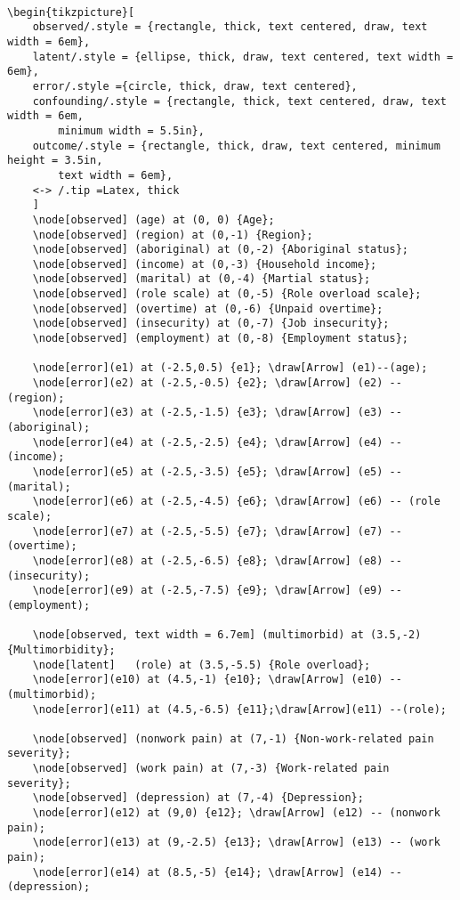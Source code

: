 \documentclass[a4paper]{report}
\begin{document}
\begin{framed}

\begin{Verbatim}

\begin{tikzpicture}[
    observed/.style = {rectangle, thick, text centered, draw, text width = 6em}, 
    latent/.style = {ellipse, thick, draw, text centered, text width = 6em},
    error/.style ={circle, thick, draw, text centered},
    confounding/.style = {rectangle, thick, text centered, draw, text width = 6em, 
        minimum width = 5.5in},
    outcome/.style = {rectangle, thick, draw, text centered, minimum height = 3.5in,
        text width = 6em},
    <-> /.tip =Latex, thick
    ]
    \node[observed] (age) at (0, 0) {Age};
    \node[observed] (region) at (0,-1) {Region};
    \node[observed] (aboriginal) at (0,-2) {Aboriginal status};
    \node[observed] (income) at (0,-3) {Household income};
    \node[observed] (marital) at (0,-4) {Martial status};
    \node[observed] (role scale) at (0,-5) {Role overload scale};
    \node[observed] (overtime) at (0,-6) {Unpaid overtime};
    \node[observed] (insecurity) at (0,-7) {Job insecurity};
    \node[observed] (employment) at (0,-8) {Employment status};

    \node[error](e1) at (-2.5,0.5) {e1}; \draw[Arrow] (e1)--(age);
    \node[error](e2) at (-2.5,-0.5) {e2}; \draw[Arrow] (e2) -- (region);
    \node[error](e3) at (-2.5,-1.5) {e3}; \draw[Arrow] (e3) -- (aboriginal);
    \node[error](e4) at (-2.5,-2.5) {e4}; \draw[Arrow] (e4) -- (income);
    \node[error](e5) at (-2.5,-3.5) {e5}; \draw[Arrow] (e5) -- (marital);
    \node[error](e6) at (-2.5,-4.5) {e6}; \draw[Arrow] (e6) -- (role scale);
    \node[error](e7) at (-2.5,-5.5) {e7}; \draw[Arrow] (e7) -- (overtime);
    \node[error](e8) at (-2.5,-6.5) {e8}; \draw[Arrow] (e8) -- (insecurity);
    \node[error](e9) at (-2.5,-7.5) {e9}; \draw[Arrow] (e9) -- (employment);
    
    \node[observed, text width = 6.7em] (multimorbid) at (3.5,-2) {Multimorbidity};
    \node[latent]   (role) at (3.5,-5.5) {Role overload};
    \node[error](e10) at (4.5,-1) {e10}; \draw[Arrow] (e10) -- (multimorbid);
    \node[error](e11) at (4.5,-6.5) {e11};\draw[Arrow](e11) --(role);
    
    \node[observed] (nonwork pain) at (7,-1) {Non-work-related pain severity};
    \node[observed] (work pain) at (7,-3) {Work-related pain severity};
    \node[observed] (depression) at (7,-4) {Depression};
    \node[error](e12) at (9,0) {e12}; \draw[Arrow] (e12) -- (nonwork pain);
    \node[error](e13) at (9,-2.5) {e13}; \draw[Arrow] (e13) -- (work pain);
    \node[error](e14) at (8.5,-5) {e14}; \draw[Arrow] (e14) -- (depression);
    

\end{Verbatim}
\end{framed}
\end{document}
